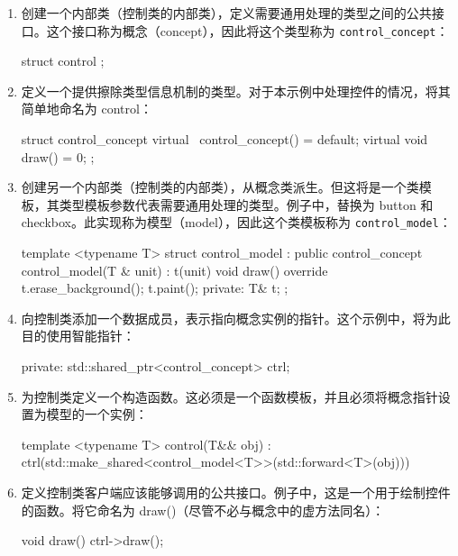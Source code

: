 \begin{enumerate}
\item
创建一个内部类（控制类的内部类），定义需要通用处理的类型之间的公共接口。这个接口称为概念（concept），因此将这个类型称为 \verb|control_concept|：

\begin{cpp}
struct control
{
};
\end{cpp}

\item
定义一个提供擦除类型信息机制的类型。对于本示例中处理控件的情况，将其简单地命名为 control：

\begin{cpp}
struct control_concept
{
    virtual ~control_concept() = default;
    virtual void draw() = 0;
};
\end{cpp}

\item
创建另一个内部类（控制类的内部类），从概念类派生。但这将是一个类模板，其类型模板参数代表需要通用处理的类型。例子中，替换为 button 和 checkbox。此实现称为模型（model），因此这个类模板称为 \verb|control_model|：

\begin{cpp}
template <typename T>
struct control_model : public control_concept
{
    control_model(T & unit) : t(unit) {}
    void draw() override
    {
        t.erase_background();
        t.paint();
    }
private:
    T& t;
};
\end{cpp}

\item
向控制类添加一个数据成员，表示指向概念实例的指针。这个示例中，将为此目的使用智能指针：

\begin{cpp}
private:
    std::shared_ptr<control_concept> ctrl;
\end{cpp}

\item
为控制类定义一个构造函数。这必须是一个函数模板，并且必须将概念指针设置为模型的一个实例：

\begin{cpp}
template <typename T>
control(T&& obj) :
ctrl(std::make_shared<control_model<T>>(std::forward<T>(obj)))
{
}
\end{cpp}

\item
定义控制类客户端应该能够调用的公共接口。例子中，这是一个用于绘制控件的函数。将它命名为 draw()（尽管不必与概念中的虚方法同名）：

\begin{cpp}
void draw()
{
    ctrl->draw();
}
\end{cpp}
\end{enumerate}


